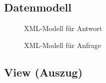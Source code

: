 \thispagestyle{empty}


\subsection{Datenmodell}
\label{app:Datenmodell}
\begin{figure}[h]
    \centering
    \caption{XML-Modell für Antwort}        
\end{figure}
\begin{figure}[!htb]
    \centering
    \caption{XML-Modell für Anfrage}
\end{figure}
\clearpage


\subsection{View (Auszug)}
\label{app:ListingView}

\clearpage


\clearpage

